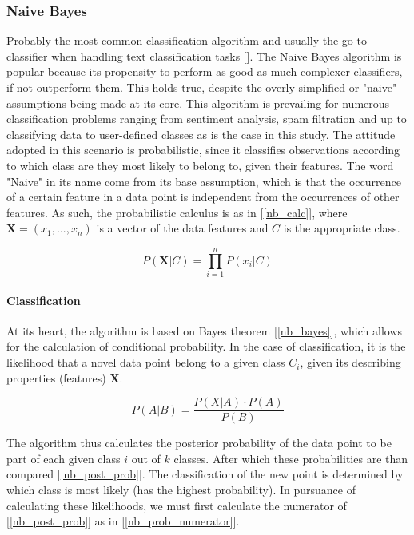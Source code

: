 \subsubsection{Naive Bayes}
	Probably the most common classification algorithm and usually the go-to classifier when handling text classification tasks [\cite{rish2001empirical}]. The Naive Bayes algorithm is popular because its propensity to perform as good as much complexer classifiers, if not outperform them. This holds true, despite the overly simplified or "naive" assumptions being made at its core. This algorithm is prevailing for numerous classification problems ranging from sentiment analysis, spam filtration and up to classifying data to user-defined classes as is the case in this study. The attitude adopted in this scenario is probabilistic, since it classifies observations according to which class are they most likely to belong to, given their features. 
	The word "Naive" in its name come from its base assumption, which is that the occurrence of a certain feature in a data point is independent from the occurrences of other features. As such, the probabilistic calculus is as in [\ref{nb_calc}], where $ \textbf{X} = (x_1,...,x_n) $ is a vector of the data features and $ C $ is the appropriate class.
	
	\begin{equation}
		P(\textbf{X}|C) = \prod_{i=1}^n P(x_i|C)
		\label{nb_calc}
	\end{equation}
	
	\paragraph{Classification}
		At its heart, the algorithm is based on Bayes theorem [\ref{nb_bayes}], which allows for the calculation of conditional probability. In the case of classification, it is the likelihood that a novel data point belong to a given class $ C_i $, given its describing properties (features) $ \textbf{X} $.
	
	\begin{equation}
		P(A|B) = \frac{P(X|A) \cdot P(A)}{P(B)}
		\label{nb_bayes}
	\end{equation}
	
		The algorithm thus calculates the posterior probability of the data point to be part of each given class $ i $  out of $ k $ classes. After which these probabilities are than compared [\ref{nb_post_prob}]. The classification of the new point is determined by which class is most likely (has the highest probability). In pursuance of calculating these likelihoods, we must first calculate the numerator of [\ref{nb_post_prob}] as in [\ref{nb_prob_numerator}].
	
